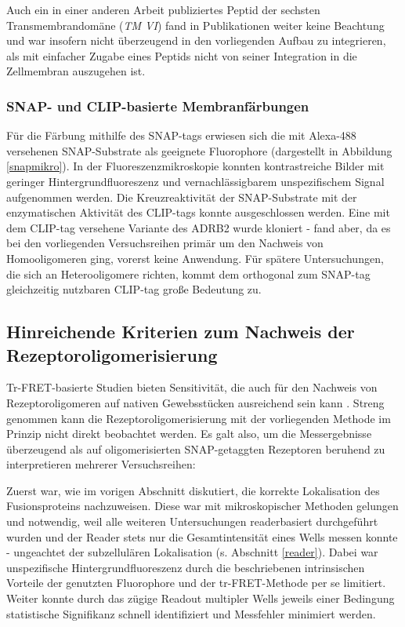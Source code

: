 Auch ein in einer anderen Arbeit \parencite{Hebert1996} publiziertes Peptid der sechsten Transmembrandomäne (\textit{TM VI}) fand in Publikationen weiter keine Beachtung und war insofern nicht überzeugend in den vorliegenden Aufbau zu integrieren, als mit einfacher Zugabe eines Peptids nicht von seiner Integration in die Zellmembran auszugehen ist. 

\subsubsection{SNAP- und CLIP-basierte Membranfärbungen}
Für die Färbung mithilfe des SNAP-tags erwiesen sich die mit Alexa-488 versehenen SNAP-Substrate als geeignete Fluorophore (dargestellt in Abbildung \ref{snapmikro}). In der Fluoreszenzmikroskopie konnten kontrastreiche Bilder mit geringer Hintergrundfluoreszenz und vernachlässigbarem unspezifischem Signal aufgenommen werden. Die Kreuzreaktivität der SNAP-Substrate mit der enzymatischen Aktivität des CLIP-tags konnte ausgeschlossen werden. Eine mit dem CLIP-tag versehene Variante des ADRB2 wurde kloniert - fand aber, da es bei den vorliegenden Versuchsreihen primär um den Nachweis von Homooligomeren ging, vorerst keine Anwendung. Für spätere Untersuchungen, die sich an Heterooligomere richten, kommt dem orthogonal zum SNAP-tag gleichzeitig nutzbaren CLIP-tag große Bedeutung zu.


\subsection{Hinreichende Kriterien zum Nachweis der Rezeptoroligomerisierung}
Tr-FRET-basierte Studien bieten Sensitivität, die auch für den Nachweis von Rezeptoroligomeren auf nativen Gewebsstücken ausreichend sein kann \parencite{Albizu2010}. Streng genommen kann die Rezeptoroligomerisierung mit der vorliegenden Methode im Prinzip nicht direkt beobachtet werden. Es galt also, um die Messergebnisse überzeugend als auf oligomerisierten SNAP-getaggten Rezeptoren beruhend zu interpretieren mehrerer Versuchsreihen:

Zuerst war, wie im vorigen Abschnitt diskutiert, die korrekte Lokalisation des Fusionsproteins nachzuweisen. Diese war mit mikroskopischer Methoden gelungen und notwendig, weil alle weiteren Untersuchungen readerbasiert durchgeführt wurden und der Reader stets nur die Gesamtintensität eines Wells messen konnte - ungeachtet der subzellulären Lokalisation (s. Abschnitt \ref{reader}). Dabei war unspezifische Hintergrundfluoreszenz durch die beschriebenen intrinsischen Vorteile der genutzten Fluorophore und der tr-FRET-Methode per se limitiert. Weiter konnte durch das zügige Readout multipler Wells jeweils einer Bedingung statistische Signifikanz schnell identifiziert und Messfehler minimiert werden. 

